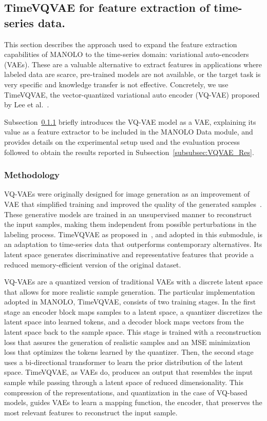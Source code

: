         
\subsection{TimeVQVAE for feature extraction of time-series data.}
\label{subsec:2.3_featext_tech2}

This section describes the approach used to expand the feature extraction capabilities of MANOLO to the time-series domain: variational auto-encoders (VAEs). These are a valuable alternative to extract features in applications where labeled data are scarce, pre-trained models are not available, or the target task is very specific and knowledge transfer is not effective. Concretely, we use TimeVQVAE, the vector-quantized variational auto encoder (VQ-VAE) proposed by Lee et al.~\cite{2023_AISTATS_vqvae}. 

Subsection~\ref{subsubsec:VQVAE_Meth} briefly introduces the VQ-VAE model as a VAE, explaining its value as a feature extractor to be included in the MANOLO Data module, and provides details on the experimental setup used and the evaluation process followed to obtain the results reported in Subsection~\ref{subsubsec:VQVAE_Res}. 
    
\subsubsection{Methodology}\label{subsubsec:VQVAE_Meth}
VQ-VAEs were originally designed for image generation as an improvement of VAE that simplified training and improved the quality of the generated samples~\cite{2017_NeurIPS_VQVAE}. These generative models are trained in an unsupervised manner to reconstruct the input samples, making them independent from possible perturbations in the labeling process. TimeVQVAE as proposed in~\cite{2023_AISTATS_vqvae}, and adopted in this submodule, is an adaptation to time-series data that outperforms contemporary alternatives. Its latent space generates discriminative and representative features that provide a reduced memory-efficient version of the original dataset.
        
VQ-VAEs are a quantized version of traditional VAEs with a discrete latent space that allows for more realistic sample generation. The particular implementation adopted in MANOLO, TimeVQVAE, consists of two training stages. In the first stage an encoder block maps samples to a latent space, a quantizer discretizes the latent space into learned tokens, and a decoder block maps vectors from the latent space back to the sample space. This stage is trained with a reconstruction loss that assures the generation of realistic samples and an MSE minimization loss that optimizes the tokens learned by the quantizer. Then, the second stage uses a bi-directional transformer to learn the prior distribution of the latent space. TimeVQVAE, as VAEs do, produces an output that resembles the input sample while passing through a latent space of reduced dimensionality. This compression of the representations, and quantization in the case of VQ-based models, guides VAEs to learn a mapping function, the encoder, that preserves the most relevant features to reconstruct the input sample.

